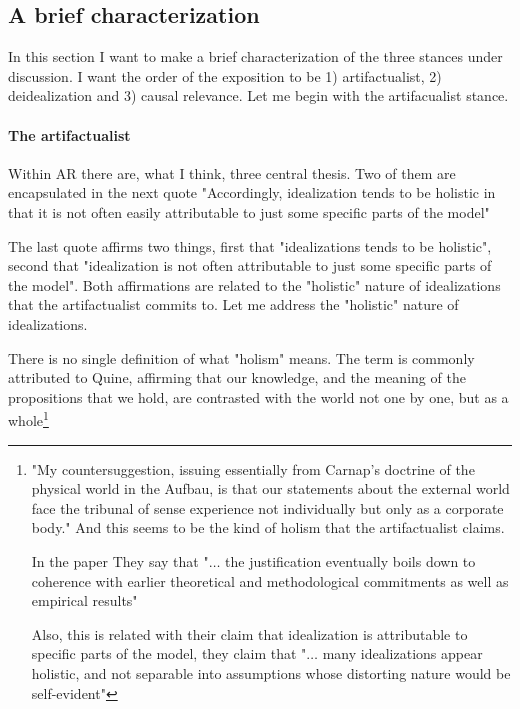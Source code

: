 {\subsection{A brief characterization}

In this section I want to make a brief characterization of the three stances under discussion.
I want the order of the exposition to be 1) artifactualist, 2) deidealization and 3) causal relevance.
Let me begin with the artifacualist stance.

\paragraph{The artifactualist}

Within AR there are, what I think, three central thesis.
Two of them are encapsulated in the next quote "Accordingly, idealization tends to be holistic in that it is not often easily attributable to just some specific parts of the model" %

The last quote affirms two things, first that "idealizations tends to be holistic", second that "idealization is not often attributable to just some specific parts of the model".
Both affirmations are related to the "holistic" nature of idealizations that the artifactualist commits to.
Let me address the "holistic" nature of idealizations.

There is no single definition of what "holism" means.
The term is commonly attributed to Quine, affirming that our knowledge, and the meaning of the propositions that we hold, are contrasted with the world not one by one, but as a whole\footnote{"My countersuggestion, issuing essentially from  Carnap's doctrine of the physical world in the Aufbau, is that our  statements about the external world face the tribunal of sense experience not individually but only as a corporate body." %
And this seems to be the kind of holism that the artifactualist claims.

In the paper %
They say that "$\ldots$ the justification eventually boils down to coherence with earlier theoretical and methodological commitments as well as empirical results" %

Also, this is related with their claim that idealization is attributable to specific parts of the model, they claim that "$\ldots$ many idealizations appear holistic, and not separable into assumptions whose distorting nature would be self-evident" %

}}
